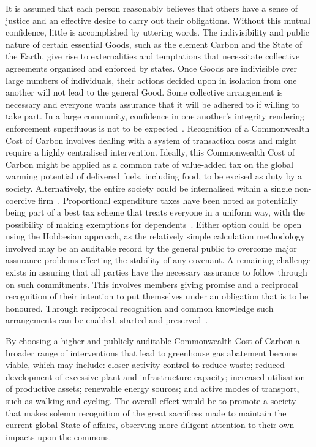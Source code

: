 \documentclass[11pt, oneside]{article}   	%
\begin{document}
It is assumed that each person reasonably believes that others have a sense of justice and an effective desire to carry out their obligations.
Without this mutual confidence, little is accomplished by uttering words.
The indivisibility and public nature of certain essential Goods, such as the element Carbon and the State of the Earth, give rise to externalities and temptations that necessitate collective agreements organised and enforced by states.
Once Goods are indivisible over large numbers of individuals, their actions decided upon in isolation from one another will not lead to the general Good.
Some collective arrangement is necessary and everyone wants assurance that it will be adhered to if willing to take part. In a large community, confidence in one another's integrity rendering enforcement superfluous is not to be expected~\cite{jr1}.
Recognition of a Commonwealth Cost of Carbon involves dealing with a system of transaction costs and might require a highly centralised intervention.
Ideally, this Commonwealth Cost of Carbon might be applied as a common rate of value-added tax on the global warming potential of delivered fuels, including food, to be excised as duty by a society.
Alternatively, the entire society could be internalised within a single non-coercive firm~\cite{rc1}.
Proportional expenditure taxes have been noted as potentially being part of a best tax scheme that treats everyone in a uniform way, with the possibility of making exemptions for dependents~\cite{nk1}.
Either option could be open using the Hobbesian approach, as the relatively simple calculation methodology involved may be an auditable record by the general public to overcome major assurance problems effecting the stability of any covenant.
A remaining challenge exists in assuring that all parties have the necessary assurance to follow through on such commitments.
This involves members giving promise and a reciprocal recognition of their intention to put themselves under an obligation that is to be honoured.
Through reciprocal recognition and common knowledge such arrangements can be enabled, started and preserved~\cite{hp1}.\

By choosing a higher and publicly auditable Commonwealth Cost of Carbon a broader range of interventions that lead to greenhouse gas abatement become viable, which may include: closer activity control to reduce waste; reduced development of excessive plant and infrastructure capacity; increased utilisation of productive assets; renewable energy sources; and active modes of transport, such as walking and cycling.
The overall effect would be to promote a society that makes solemn recognition of the great sacrifices made to maintain the current global State of affairs, observing more diligent attention to their own impacts upon the commons.\
\end{document}

